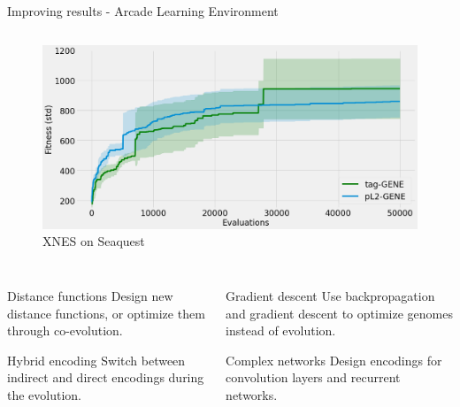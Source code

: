 \begin{frame}{\tciii{} Improving results - Arcade Learning Environment}
{\begin{columns}
      \begin{column}{0.45\linewidth}
        \begin{center}
          \begin{figure}
              \centering
   \includegraphics[width=.9\linewidth]{images/GENE/plots/seaquest - 128-64-64-18 - xnes.png}
        \small XNES on Seaquest
          \end{figure}
        \end{center}
      \end{column}
    \end{columns}
    }
  \end{frame}
  
  
  \begin{frame}{\tciii{} \fw}
    
    \begin{columns}
    \begin{column}{0.45\linewidth}
    \begin{center}
    \begin{block}{Distance functions}
    Design new distance functions, or optimize them through co-evolution.
    \end{block}
    
    \begin{block}{Hybrid encoding}
    Switch between indirect and direct encodings during the evolution.
    \end{block}
    \end{center}
    \end{column}
    
    \begin{column}{0.45\linewidth}
    \begin{center}
    \begin{block}{Gradient descent}
    Use backpropagation and gradient descent to optimize genomes instead of evolution.
    \end{block}
    
    \begin{block}{Complex networks}
    Design encodings for convolution layers and recurrent networks.
    \end{block}
    \end{center}
    \end{column}
    \end{columns}
    
    \end{frame}